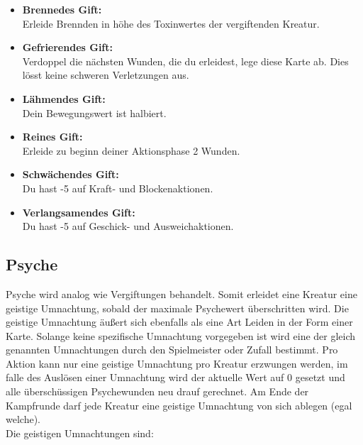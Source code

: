 \begin{itemize}
    \item \textbf{Brennedes Gift:}\\
    Erleide Brennden in höhe des Toxinwertes der vergiftenden Kreatur.
    \item \textbf{Gefrierendes Gift:}\\
    Verdoppel die nächsten Wunden, die du erleidest, lege diese Karte ab. Dies lösst keine schweren Verletzungen aus.
    \item \textbf{Lähmendes Gift:}\\
    Dein Bewegungswert ist halbiert.
    \item \textbf{Reines Gift:}\\
    Erleide zu beginn deiner Aktionsphase 2 Wunden.
    \item \textbf{Schwächendes Gift:}\\
    Du hast -5 auf Kraft- und Blockenaktionen.
    \item \textbf{Verlangsamendes Gift:}\\
    Du hast -5 auf Geschick- und Ausweichaktionen.
\end{itemize}


\subsection*{Psyche}
Psyche wird analog wie Vergiftungen behandelt. Somit erleidet eine Kreatur eine geistige Umnachtung, sobald der maximale Psychewert überschritten wird.
Die geistige Umnachtung äußert sich ebenfalls als eine Art Leiden in der Form einer Karte. Solange keine spezifische Umnachtung vorgegeben ist wird eine der gleich genannten Umnachtungen durch den Spielmeister oder Zufall bestimmt.
Pro Aktion kann nur eine geistige Umnachtung pro Kreatur erzwungen werden, im falle des Auslösen einer Umnachtung wird der aktuelle Wert auf 0 gesetzt und alle überschüssigen Psychewunden neu drauf gerechnet.
Am Ende der Kampfrunde darf jede Kreatur eine geistige Umnachtung von sich ablegen (egal welche).\\
Die geistigen Umnachtungen sind:

